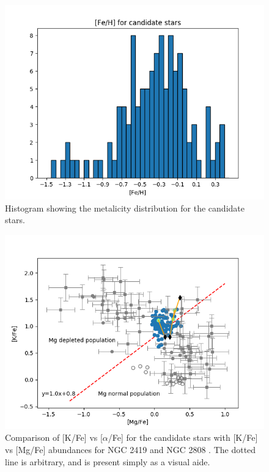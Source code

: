 \documentclass[a4paper,fleqn,usenatbib]{mnras}
\begin{document}
\begin{figure}
	\includegraphics[width=\columnwidth]{histof113.png}
    \caption{Histogram showing the metalicity distribution for the candidate stars.}
    \label{mhist}
\end{figure}

\begin{figure}
	\includegraphics[width=\columnwidth]{Kvsmgmod.png}
    \caption{Comparison of [K/Fe] vs [$\alpha$/Fe] for the candidate stars with [K/Fe] vs [Mg/Fe] abundances for NGC 2419 and NGC 2808 \citep{cohenkirby2012, mucciarelli2012, mucciarelli2015}. The dotted line is arbitrary, and is present simply as a visual aide.}
    \label{KvsMg}
\end{figure}
\end{document}
